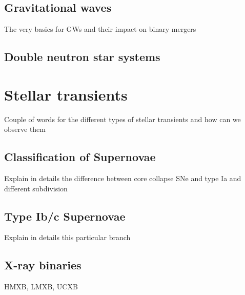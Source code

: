 \documentclass[../../main/thesis_msc.tex]{subfiles}
\begin{document}
			\subsection{Gravitational waves}
			
				The very basics for GWs and their impact on binary mergers
				
			\subsection{Double neutron star systems}
				
	\section{Stellar transients}
	
		Couple of words for the different types of stellar transients and how can we observe them
		
			\subsection{Classification of Supernovae}
			
				Explain in details the difference between core collapse SNe and type Ia and different subdivision
				
			\subsection{Type Ib/c Supernovae}
			
				Explain in details this particular branch
				
			\subsection{X-ray binaries}
			
				HMXB, LMXB, UCXB
    
    
    
\end{document}
